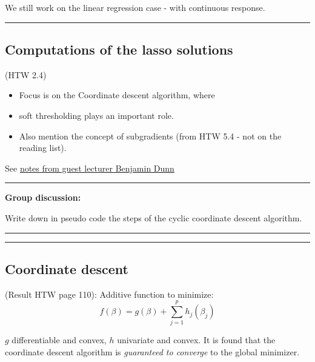 \documentclass[
]{article}
\providecommand{\tightlist}{%
  \setlength{\itemsep}{0pt}\setlength{\parskip}{0pt}}
\begin{document}
We still work on the linear regression case - with continuous response.

\begin{center}\rule{0.5\linewidth}{0.5pt}\end{center}

\hypertarget{computations-of-the-lasso-solutions}{%
\subsection{Computations of the lasso
solutions}\label{computations-of-the-lasso-solutions}}

(HTW 2.4)

\begin{itemize}
\tightlist
\item
  Focus is on the Coordinate descent algorithm, where
\item
  soft thresholding plays an important role.
\item
  Also mention the concept of subgradients (from HTW 5.4 - not on the
  reading list).
\end{itemize}

See
\href{https://github.com/mettelang/MA8701V2021/blob/main/Part1/LassoNotesBenDunn.pdf}{notes
from guest lecturer Benjamin Dunn}

\begin{center}\rule{0.5\linewidth}{0.5pt}\end{center}

\textbf{Group discussion:}

Write down in pseudo code the steps of the cyclic coordinate descent
algorithm.

\begin{center}\rule{0.5\linewidth}{0.5pt}\end{center}

\begin{center}\rule{0.5\linewidth}{0.5pt}\end{center}

\hypertarget{coordinate-descent}{%
\subsection{Coordinate descent}\label{coordinate-descent}}

(Result HTW page 110): Additive function to minimize:
\[ f(\beta)=g(\beta)+\sum_{j=1}^p h_j(\beta_j)\]

\(g\) differentiable and convex, \(h\) univariate and convex. It is
found that the coordinate descent algorithm is \emph{guaranteed to
converge} to the global minimizer.
\end{document}
